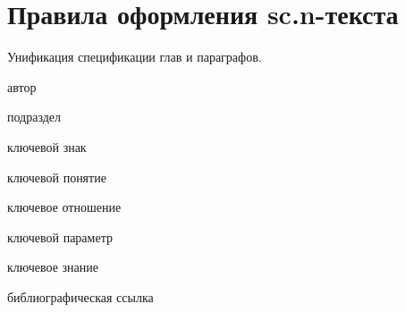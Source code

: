 \section*{Правила оформления sc.n-текста}

Унификация спецификации глав и параграфов.

\begin{SCn}
	
	\bigskip
	
	
	\bigskip
	
	\begin{scnrelfromlist}{автор}
	\end{scnrelfromlist}
	
	\bigskip
	
	
	\bigskip
	
	\begin{scnrelfromlist}{подраздел}
	\end{scnrelfromlist}

	\bigskip

	\begin{scnrelfromlist}{ключевой знак}
	\end{scnrelfromlist}
	
	\bigskip
	
	\begin{scnrelfromlist}{ключевой понятие}
	\end{scnrelfromlist}
	
	\bigskip
	
	\begin{scnrelfromlist}{ключевое отношение}
	\end{scnrelfromlist}
	
	\bigskip
	
	\begin{scnrelfromlist}{ключевой параметр}
	\end{scnrelfromlist}
	
	\bigskip
	
	\begin{scnrelfromlist}{ключевое знание}
	\end{scnrelfromlist}

	\bigskip
	
	\begin{scnrelfromlist}{библиографическая ссылка}
	\end{scnrelfromlist}
	
\end{SCn}

